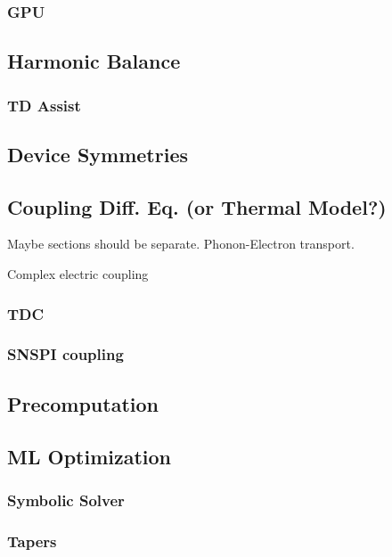 \documentclass{article}
\begin{document}
\subsubsection{GPU}

\subsection{Harmonic Balance}

\subsubsection{TD Assist}

\subsection{Device Symmetries}

\subsection{Coupling Diff. Eq. (or Thermal Model?)}

Maybe sections should be separate. Phonon-Electron transport.

Complex electric coupling

\subsubsection{TDC}

\subsubsection{SNSPI coupling}

\subsection{Precomputation}

\subsection{ML Optimization}

\subsubsection{Symbolic Solver}

\subsubsection{Tapers}
\end{document}
